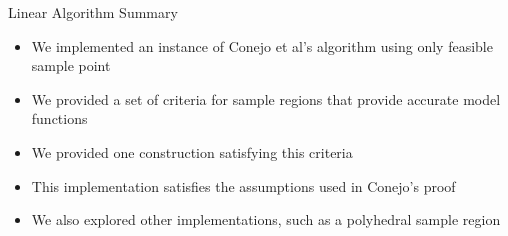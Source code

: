 \documentclass{beamer}
\newcommand{\xk}{{{x}^{(k)}}}
\begin{document}
\begin{frame}{Linear Algorithm Summary}
	\begin{itemize}
		\item We implemented an instance of Conejo et al's algorithm using only feasible sample point
		\item We provided a set of criteria for sample regions that provide accurate model functions
		\item We provided one construction satisfying this criteria
		\item This implementation satisfies the assumptions used in Conejo's proof
		\item We also explored other implementations, such as a polyhedral sample region
	\end{itemize}
\end{frame}

% 	

% 
\end{document}
